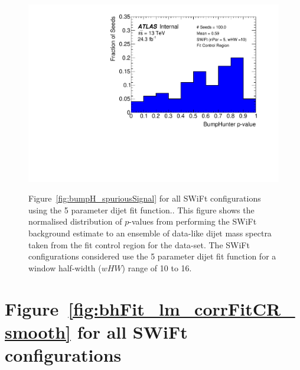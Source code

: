 \begin{figure}[!htb]
{}\hspace{-3mm}                                       
 {                                                    
  \includegraphics[width=0.48\linewidth, angle=0]{figs/Dibjet/LowMass/FitStudy_min566/pVal_bumpHunter_corrFitCR_5para_low10_high10.pdf}
}
\caption[Figure~\ref{fig:bumpH_spuriousSignal} for all SWiFt configurations using the 5 parameter dijet fit function.]
 {\label{fig:app-bumpH_spuriousSignal_5para}
 Figure~\ref{fig:bumpH_spuriousSignal} for all SWiFt configurations using the 5 parameter dijet fit function..
  This figure shows the normalised distribution of \bh{} $p$-values from performing the SWiFt background estimate to an ensemble of
  data-like dijet mass spectra taken from the fit control region for the \lm{} data-set.
  The SWiFt configurations considered use the 5 parameter dijet fit function for a window half-width ($wHW$) range of 10 to 16.
}
\end{figure}

\clearpage

\section{Figure~\ref{fig:bhFit_lm_corrFitCR_smooth} for all SWiFt configurations}
\vspace{5em}


